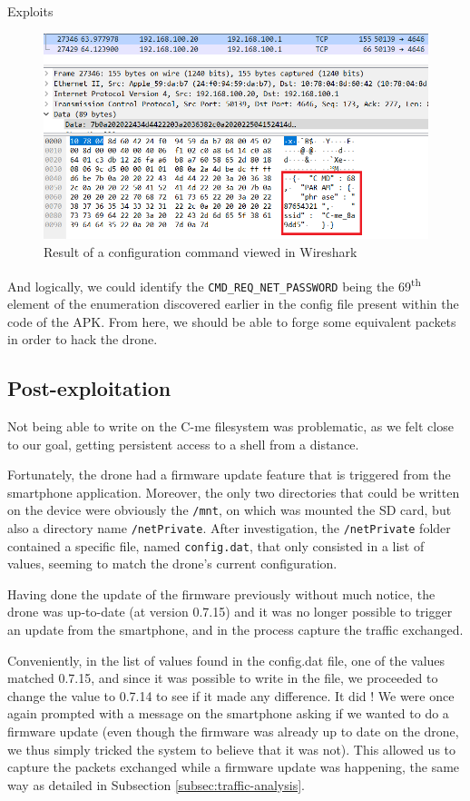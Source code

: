 \begin{chaptercover}{Exploits}
\begin{figure}[H]
  \centering
  \includegraphics[width=\linewidth]{figures/config-command}
  \caption{Result of a configuration command viewed in Wireshark}
  \label{fig:config-command}
\end{figure}

And logically, we could identify the \texttt{CMD\_REQ\_NET\_PASSWORD} being the 69\textsuperscript{th} element of the enumeration discovered earlier in the config file present within the code of the APK. From here, we should be able to forge some equivalent packets in order to hack the drone.

\subsection{Post-exploitation}

Not being able to write on the C-me filesystem was problematic, as we felt close to our goal, getting persistent access to a shell from a distance.

Fortunately, the drone had a firmware update feature that is triggered from the smartphone application. Moreover, the only two directories that could be written on the device were obviously the \texttt{/mnt}, on which was mounted the SD card, but also a directory name \texttt{/netPrivate}. After investigation, the \texttt{/netPrivate} folder contained a specific file, named \texttt{config.dat}, that only consisted in a list of values, seeming to match the drone’s current configuration. 

Having done the update of the firmware previously without much notice, the drone was up-to-date (at version 0.7.15) and it was no longer possible to trigger an update from the smartphone, and in the process capture the traffic exchanged.

Conveniently, in the list of values found in the config.dat file, one of the values matched 0.7.15, and since it was possible to write in the file, we proceeded to change the value to 0.7.14 to see if it made any difference. It did ! We were once again prompted with a message on the smartphone asking if we wanted to do a firmware update (even though the firmware was already up to date on the drone, we thus simply tricked the system to believe that it was not). This allowed us to capture the packets exchanged while a firmware update was happening, the same way as detailed in Subsection \ref{subsec:traffic-analysis}.


\end{chaptercover}
